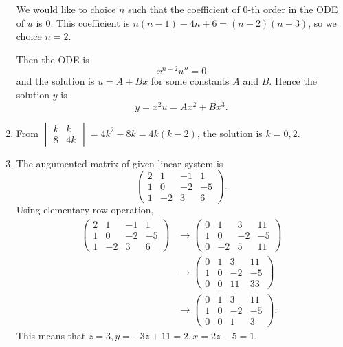 \documentclass{article}
\begin{document}
\begin{enumerate}
    We would like to choice $n$ such that the coefficient of $0$-th order in the ODE of $u$ is $0$.
    This coefficient is $n(n-1) - 4n +6 = (n-2)(n-3)$, so we choice $n=2$.
    
    Then the ODE is 
    $$
      x^{n+2} u'' = 0
    $$
    and the solution is $u = A + Bx$ for some constants $A$ and $B$.
    Hence the solution $y$ is
    $$
      y = x^2 u = A x^2 + B x^3.
    $$

  \item 
    From $\begin{vmatrix} k & k \\ 8 & 4k \end{vmatrix} = 4k^2 - 8k = 4k(k-2)$,
    the solution is $k = 0, 2$.

  \item 
    The augumented matrix of given linear system is
    $$
      \begin{pmatrix}
        2 & 1  & -1 & 1 \\
        1 & 0  & -2 & -5 \\
        1 & -2 & 3  & 6
      \end{pmatrix}.
    $$
    Using elementary row operation,
    \begin{align*}
      \begin{pmatrix}
        2 & 1  & -1 & 1 \\
        1 & 0  & -2 & -5 \\
        1 & -2 & 3  & 6
      \end{pmatrix}
      &\to
      \begin{pmatrix}
        0 & 1  & 3  & 11 \\
        1 & 0  & -2 & -5 \\
        0 & -2 & 5  & 11
      \end{pmatrix} \\
      &\to
      \begin{pmatrix}
      0 & 1  & 3  & 11 \\
      1 & 0  & -2 & -5 \\
      0 & 0  & 11 & 33
      \end{pmatrix} \\
      &\to
      \begin{pmatrix}
      0 & 1  & 3  & 11 \\
      1 & 0  & -2 & -5 \\
      0 & 0  & 1  & 3
      \end{pmatrix}.
    \end{align*}
    This means that $z = 3, y = -3z + 11 = 2, x = 2z - 5 = 1$.


\end{enumerate}
\end{document}
